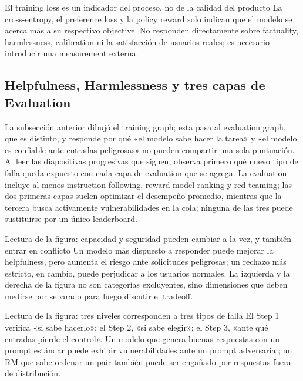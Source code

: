 
\begin{importantbox}{El training loss es un indicador del proceso, no de la calidad del producto}
La cross-entropy, el preference loss y la policy reward solo indican que el modelo se acerca más a su respectivo objective. No responden directamente sobre factuality, harmlessness, calibration ni la satisfacción de usuarios reales; es necesario introducir una measurement externa.
\end{importantbox}

\subsection{Helpfulness, Harmlessness y tres capas de Evaluation}

La subsección anterior dibujó el training graph; esta pasa al evaluation graph, que es distinto, y responde por qué «el modelo sabe hacer la tarea» y «el modelo es confiable ante entradas peligrosas» no pueden compartir una sola puntuación. Al leer las diapositivas progresivas que siguen, observa primero qué nuevo tipo de falla queda expuesto con cada capa de evaluation que se agrega. La evaluation incluye al menos instruction following, reward-model ranking y red teaming; las dos primeras capas suelen optimizar el desempeño promedio, mientras que la tercera busca activamente vulnerabilidades en la cola; ninguna de las tres puede sustituirse por un único leaderboard.


\begin{knowledgebox}{Lectura de la figura: capacidad y seguridad pueden cambiar a la vez, y también entrar en conflicto}
Un modelo más dispuesto a responder puede mejorar la helpfulness, pero aumenta el riesgo ante solicitudes peligrosas; un rechazo más estricto, en cambio, puede perjudicar a los usuarios normales. La izquierda y la derecha de la figura no son categorías excluyentes, sino dimensiones que deben medirse por separado para luego discutir el tradeoff.
\end{knowledgebox}


\begin{knowledgebox}{Lectura de la figura: tres niveles corresponden a tres tipos de falla}
El Step 1 verifica «si sabe hacerlo»; el Step 2, «si sabe elegir»; el Step 3, «ante qué entradas pierde el control». Un modelo que genera buenas respuestas con un prompt estándar puede exhibir vulnerabilidades ante un prompt adversarial; un RM que sabe ordenar un pair también puede ser engañado por respuestas fuera de distribución.
\end{knowledgebox}

